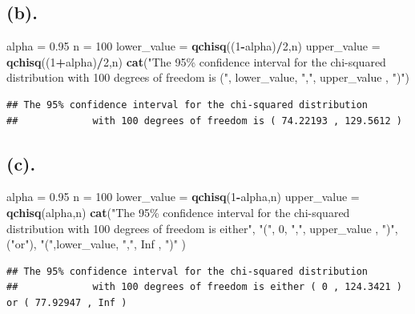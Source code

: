 \documentclass[
]{article}
\newenvironment{Shaded}{\begin{snugshade}}{\end{snugshade}}
\newcommand{\ConstantTok}[1]{\textcolor[rgb]{0.56,0.35,0.01}{#1}}
\newcommand{\DecValTok}[1]{\textcolor[rgb]{0.00,0.00,0.81}{#1}}
\newcommand{\FloatTok}[1]{\textcolor[rgb]{0.00,0.00,0.81}{#1}}
\newcommand{\FunctionTok}[1]{\textcolor[rgb]{0.13,0.29,0.53}{\textbf{#1}}}
\newcommand{\NormalTok}[1]{#1}
\newcommand{\OtherTok}[1]{\textcolor[rgb]{0.56,0.35,0.01}{#1}}
\newcommand{\SpecialCharTok}[1]{\textcolor[rgb]{0.81,0.36,0.00}{\textbf{#1}}}
\newcommand{\StringTok}[1]{\textcolor[rgb]{0.31,0.60,0.02}{#1}}
\begin{document}
\newpage
\subsection*{(b). }

\begin{Shaded}
\begin{Highlighting}[]
\NormalTok{alpha }\OtherTok{=} \FloatTok{0.95}
\NormalTok{n }\OtherTok{=} \DecValTok{100}
\NormalTok{lower\_value }\OtherTok{=} \FunctionTok{qchisq}\NormalTok{((}\DecValTok{1}\SpecialCharTok{{-}}\NormalTok{alpha)}\SpecialCharTok{/}\DecValTok{2}\NormalTok{,n)}
\NormalTok{upper\_value }\OtherTok{=} \FunctionTok{qchisq}\NormalTok{((}\DecValTok{1}\SpecialCharTok{+}\NormalTok{alpha)}\SpecialCharTok{/}\DecValTok{2}\NormalTok{,n)}
\FunctionTok{cat}\NormalTok{(}\StringTok{"The 95\% confidence interval for the chi{-}squared distribution }
\StringTok{            with 100 degrees of freedom is ("}\NormalTok{, lower\_value, }\StringTok{","}\NormalTok{, upper\_value , }\StringTok{")"}\NormalTok{)}
\end{Highlighting}
\end{Shaded}

\begin{verbatim}
## The 95% confidence interval for the chi-squared distribution 
##             with 100 degrees of freedom is ( 74.22193 , 129.5612 )
\end{verbatim}

\subsection{(c). }

\begin{Shaded}
\begin{Highlighting}[]
\NormalTok{alpha }\OtherTok{=} \FloatTok{0.95}
\NormalTok{n }\OtherTok{=} \DecValTok{100}
\NormalTok{lower\_value }\OtherTok{=} \FunctionTok{qchisq}\NormalTok{(}\DecValTok{1}\SpecialCharTok{{-}}\NormalTok{alpha,n)}
\NormalTok{upper\_value }\OtherTok{=} \FunctionTok{qchisq}\NormalTok{(alpha,n)}
\FunctionTok{cat}\NormalTok{(}\StringTok{"The 95\% confidence interval for the chi{-}squared distribution }
\StringTok{            with 100 degrees of freedom is either"}\NormalTok{, }\StringTok{"("}\NormalTok{, }\DecValTok{0}\NormalTok{, }\StringTok{","}\NormalTok{, upper\_value , }\StringTok{")"}\NormalTok{, }
\NormalTok{            (}\StringTok{"or"}\NormalTok{), }\StringTok{"("}\NormalTok{,lower\_value, }\StringTok{","}\NormalTok{, }\ConstantTok{Inf}\NormalTok{ , }\StringTok{")"}\NormalTok{ )}
\end{Highlighting}
\end{Shaded}

\begin{verbatim}
## The 95% confidence interval for the chi-squared distribution 
##             with 100 degrees of freedom is either ( 0 , 124.3421 ) or ( 77.92947 , Inf )
\end{verbatim}
\end{document}
